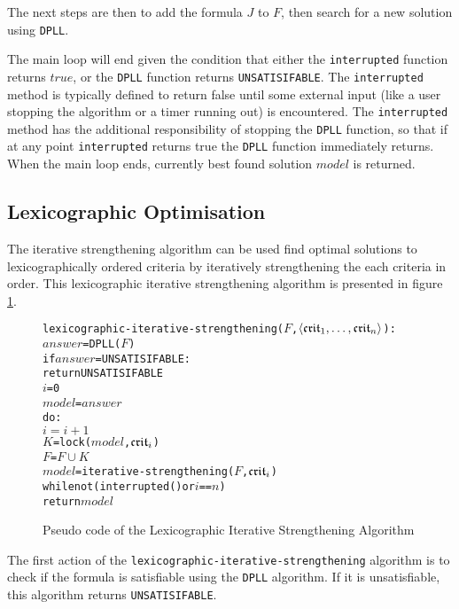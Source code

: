 The next steps are then to add the formula $J$ to $F$, then search for a new solution using \texttt{DPLL}.

The main loop will end given the condition that either the \texttt{interrupted} function returns $true$, or the \texttt{DPLL} function returns \texttt{UNSATISIFABLE}.
The \texttt{interrupted} method is typically defined to return false until some external input (like a user stopping the algorithm or a timer running out) is encountered.
The \texttt{interrupted} method has the additional responsibility of stopping the \texttt{DPLL} function, 
so that if at any point \texttt{interrupted} returns true the \texttt{DPLL} function immediately returns.
When the main loop ends, currently best found solution $model$ is returned.

\subsection{Lexicographic Optimisation}
\label{impl.lexiterstre}
The iterative strengthening algorithm can be used find optimal solutions to lexicographically ordered criteria
by iteratively strengthening the each criteria in order.
This lexicographic iterative strengthening algorithm is presented in figure \ref{impl.lexstrength}.

\begin{figure}[htp]
\begin{center}
\begin{alltt}
lexicographic-iterative-strengthening(\(F\),\(\langle{}\mathfrak{crit}\sb{1}, \ldots ,\mathfrak{crit}\sb{n}\rangle\)):  
    \(answer\) = DPLL(\(F\))
    if \(answer\) = UNSATISIFABLE:
        return UNSATISIFABLE
    \(i\) = 0
    \(model\) = \(answer\)
    do:
        \(i = i + 1\)
        \(K\) = lock(\(model\),\(\mathfrak{crit}\sb{i}\))
        \(F\) = \(F \cup K\)
        \(model\) = iterative-strengthening(\(F\),\(\mathfrak{crit}\sb{i}\))
    while not (interrupted() or \(i\) == \(n\))
    return \(model\) 
\end{alltt}
  \caption{Pseudo code of the Lexicographic Iterative Strengthening Algorithm}
  \label{impl.lexstrength}
\end{center}
\end{figure}

The first action of the \texttt{lexicographic-iterative-strengthening} algorithm is to check if the formula is satisfiable using the \texttt{DPLL} algorithm.
If it is unsatisfiable, this algorithm returns \texttt{UNSATISIFABLE}.

